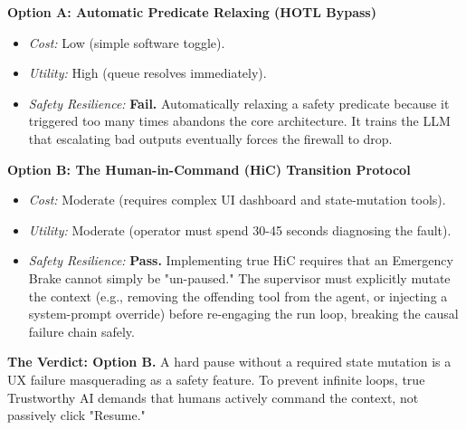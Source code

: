\begin{tcolorbox}[scorecardbox, title={Sovereign AI Scorecard Evaluation}]
\textbf{Option A: Automatic Predicate Relaxing (HOTL Bypass)}
\begin{itemize}
    \item \textit{Cost:} Low (simple software toggle).
    \item \textit{Utility:} High (queue resolves immediately).
    \item \textit{Safety Resilience:} \textbf{Fail.} Automatically relaxing a safety predicate because it triggered too many times abandons the core architecture. It trains the LLM that escalating bad outputs eventually forces the firewall to drop.
\end{itemize}

\textbf{Option B: The Human-in-Command (HiC) Transition Protocol}
\begin{itemize}
    \item \textit{Cost:} Moderate (requires complex UI dashboard and state-mutation tools).
    \item \textit{Utility:} Moderate (operator must spend 30-45 seconds diagnosing the fault).
    \item \textit{Safety Resilience:} \textbf{Pass.} Implementing true HiC requires that an Emergency Brake cannot simply be "un-paused." The supervisor must explicitly mutate the context (e.g., removing the offending tool from the agent, or injecting a system-prompt override) before re-engaging the run loop, breaking the causal failure chain safely.
\end{itemize}

\textbf{The Verdict: Option B.} 
A hard pause without a required state mutation is a UX failure masquerading as a safety feature. To prevent infinite loops, true Trustworthy AI demands that humans actively command the context, not passively click "Resume."
\end{tcolorbox}